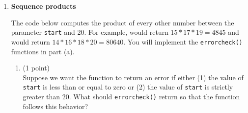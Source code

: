 \documentclass{article}
\newcounter{points}
\newcounter{bonuspoints}
\newcommand\setpoint{\addtocounter{points}{1}(1 point)}
\newcommand\setbonuspoint{\addtocounter{bonuspoints}{1}(1 bonus point)}
\begin{document}
\begin{enumerate}
\begin{enumerate}
\item \setpoint \\

\end{enumerate}

\begin{enumerate}
\setcounter{enumii}{1}
\item \setpoint \\

\end{enumerate}

\begin{enumerate}
\setcounter{enumii}{2}
\item \setpoint \\

\end{enumerate}

\begin{enumerate}
\setcounter{enumii}{3}
\item \setpoint \\

\end{enumerate}

\begin{enumerate}
\setcounter{enumii}{4}
\item \setbonuspoint \\

\end{enumerate}


\item \textbf{Sequence products}

The code below computes the product of every other number between the parameter \texttt{start} and $20$.  For example,  would return $15 * 17 * 19 = 4845$ and  would return $14 * 16 * 18 * 20 = 80640$.  You will implement the \texttt{errorcheck()} functions in part (a). \\



\begin{enumerate}
\item \setpoint \\
Suppose we want the function to return an error if either (1) the value of \texttt{start} is less than or equal to zero or (2) the value of \texttt{start} is strictly greater than $20$.  What should \texttt{errorcheck()} return so that the function follows this behavior?
\end{enumerate}


\end{enumerate}
\end{document}
